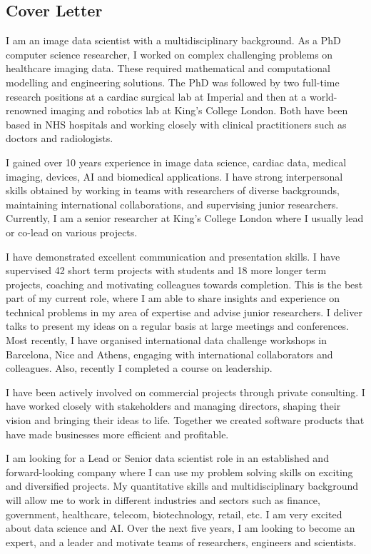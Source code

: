 \documentclass[letterpaper]{twentysecondcv} %
\begin{document}

\begin{center}
\section{Cover Letter}
\end{center}
\large
I am an image data scientist with a multidisciplinary background. As a PhD computer science researcher, I worked on complex challenging problems on healthcare imaging data. These required mathematical and computational modelling and engineering solutions. The PhD was followed by two full-time research positions at a cardiac surgical lab at Imperial and then at a world-renowned imaging and robotics lab at King's College London. Both have been based in NHS hospitals and working closely with clinical practitioners such as doctors and radiologists. 

I gained over 10 years experience in image data science, cardiac data, medical imaging, devices, AI and biomedical applications. I have strong interpersonal skills obtained by working in teams with researchers of diverse backgrounds, maintaining international collaborations, and supervising junior researchers. Currently, I am a senior researcher at King's College London where I usually lead or co-lead on various projects.

I have demonstrated excellent communication and presentation skills. I have supervised 42 short term projects with students and 18 more longer term projects, coaching and motivating colleagues towards completion. This is the best part of my current role, where I am able to share insights and experience on technical problems in my area of expertise and advise junior researchers. I deliver talks to present my ideas on a regular basis at large meetings and conferences. Most recently, I have organised international data challenge workshops in Barcelona, Nice and Athens, engaging with international collaborators and colleagues. Also, recently I completed a course on leadership. 

I have been actively involved on commercial projects through private consulting. I have worked closely with stakeholders and managing directors, shaping their vision and bringing their ideas to life. Together we created software products that have made businesses more efficient and profitable.

I am looking for a Lead or Senior data scientist role in an established and forward-looking company where I can use my problem solving skills on exciting and diversified projects. My quantitative skills and multidisciplinary background will allow me to work in different industries and sectors such as finance, government, healthcare, telecom, biotechnology, retail, etc. I am very excited about data science and AI. Over the next five years, I am looking to become an expert, and a leader and motivate teams of researchers, engineers and scientists.  


 
\end{document}
